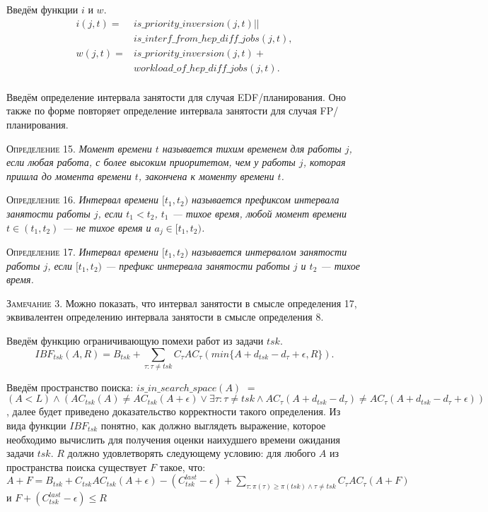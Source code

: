 Введём функции $i$ и $w$.
  \begin{align*}
    i(j,t) = & is\_priority\_inversion(j, t) || \\
             & is\_interf\_from\_hep\_diff\_jobs(j,t), \\
  w(j,t) = & is\_priority\_inversion(j, t) + \\
           & workload\_of\_hep\_diff\_jobs(j,t).
           \\
  \end{align*}

Введём определение интервала занятости для случая EDF\-/планирования. Оно также
  по форме повторяет определение интервала занятости для случая FP\-/планирования.

\textsc{Определение 15.}
\textit{Момент времени $t$ называется тихим временем для работы $j$, если
  любая работа, с более высоким приоритетом, чем у работы $j$,
  которая пришла до момента времени $t$, закончена к моменту времени $t$. }

\textsc{Определение 16.}
\textit{Интервал времени $[t_1, t_2)$ называется префиксом интервала занятости работы $j$,
  если $t_1 < t_2$, $t_1$ --- тихое время, любой момент времени $t \in (t_1, t_2)$ --- не тихое время и
  $a_{j} \in [t_1, t_2)$. }

\textsc{Определение 17.}
\textit{Интервал времени $[t_1, t_2)$ называется интервалом занятости работы $j$,
  если $[t_1, t_2)$ --- префикс интервала занятости работы $j$ и $t_2$ --- тихое время. }

\textsc{Замечание 3.} Можно показать, что интервал занятости в смысле определения 17,
  эквивалентен определению интервала занятости в смысле определения 8.

Введём функцию ограничивающую помехи работ из задачи $tsk$.
  $$IBF_{tsk}(A, R) = B_{tsk} + \sum_{\tau:\tau \neq tsk} C_{\tau}AC_{\tau}( min\{A + d_{tsk} - d_{\tau} + \epsilon, R\} ).$$

Введём пространство поиска: $is\_in\_search\_space(A)$ $=$
    $(A < L) \wedge
      (AC_{tsk}(A) \neq AC_{tsk}(A + \epsilon)
       \vee \exists \tau: \tau \neq tsk \wedge AC_{\tau}(A + d_{tsk} - d_{\tau}) \neq
                                               AC_{\tau}(A + d_{tsk} - d_{\tau} + \epsilon) )$,
  далее будет приведено доказательство корректности такого определения.
  Из вида функции $IBF_{tsk}$ понятно, как должно выглядеть выражение, которое необходимо
  вычислить для получения оценки наихудшего времени ожидания задачи $tsk$.
  $R$ должно удовлетворять следующему условию: для любого $A$ из пространства поиска
  существует $F$ такое, что: $A + F = B_{tsk} +  C_{tsk}AC_{tsk}(A + \epsilon) - (C_{tsk}^{last} - \epsilon) +
    \sum_{\tau:\pi(\tau) \geq \pi(tsk) \wedge \tau \neq tsk} C_{\tau}AC_{\tau}(A+F)$ и $F + (C_{tsk}^{last} - \epsilon) \leq R$

